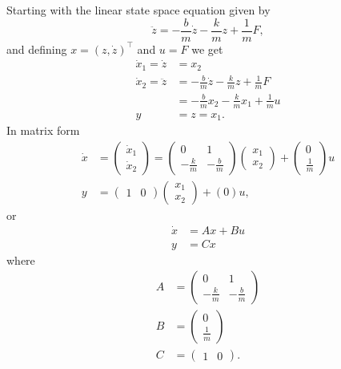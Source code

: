 
Starting with the linear state space equation given by
\[
\ddot{z} =  - \frac{b}{m}\dot{z} - \frac{k}{m} z +  \frac{1}{m} F,
\]
and defining $x=(z, \dot{z})^\top$ and $u = F$ we get
\begin{align*}
  \dot{x}_1 = \dot{z} &= x_2 \\
  \dot{x}_2 = \ddot{z} &= - \frac{b}{m}\dot{z} - \frac{k}{m} z +  \frac{1}{m} F \\
  &= - \frac{b}{m} x_2 -  \frac{k}{m} x_1 + \frac{1}{m} u   \\
  y &= z = x_1.
\end{align*}
In matrix form
\begin{align*}
  \dot{x} &= \begin{pmatrix}
    \dot{x}_1 \\
    \dot{x}_2
  \end{pmatrix} =
  \begin{pmatrix}
    0 & 1 \\
    -\frac{k}{m} & - \frac{b}{m}
  \end{pmatrix}
  \begin{pmatrix}
    x_1 \\
    x_2
  \end{pmatrix}
  +
  \begin{pmatrix}
    0 \\
    \frac{1}{m}
  \end{pmatrix}
   u \\
   y &= \begin{pmatrix}
     1 & 0
   \end{pmatrix}
     \begin{pmatrix}
    x_1 \\
    x_2
  \end{pmatrix}
  +
  ( 0 ) u,
\end{align*}
or 
\begin{align*}
\dot{x} &= Ax + Bu \\
y &= Cx
\end{align*}
where
\begin{align*}
A&=\begin{pmatrix} 0 & 1 \\  -\frac{k}{m}  & -\frac{b}{m} \end{pmatrix} \\
B&=\begin{pmatrix} 0 \\ \frac{1}{m} \end{pmatrix} \\
C&=\begin{pmatrix} 1 & 0\end{pmatrix}.
\end{align*}
